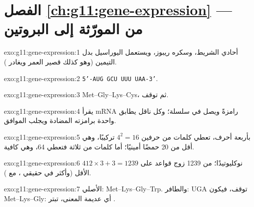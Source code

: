 \section*{الفصل \ref{ch:g11:gene-expression} --- من المورّثة إلى البروتين}

\begin{solution}{exo:g11:gene-expression:1}
 أحادي الشريط، وسكره ريبوز، ويستعمل اليوراسيل بدل التيمين (وهو
كذلك قصير العمر ويغادر ).
\end{solution}

\begin{solution}{exo:g11:gene-expression:2}
\texttt{5'-AUG GCU UUU UAA-3'}.
\end{solution}

\begin{solution}{exo:g11:gene-expression:3}
Met--Gly--Lys--Cys، ثم توقف.
\end{solution}

\begin{solution}{exo:g11:gene-expression:4}
 يقرأ mRNA رامزةً  ويصل  في سلسلة؛ وكل
 ناقل يطابق  واحدة برامزته المضادة ويجلب 
الموافق.
\end{solution}

\begin{solution}{exo:g11:gene-expression:5}
بأربعة أحرف، تعطي كلمات من حرفين $4^2 = 16$ تركيبًا، وهي أقل من 20
حمضًا أمينيًا؛ أما كلمات من ثلاثة فتعطي 64، وهي كافية.
\end{solution}

\begin{solution}{exo:g11:gene-expression:6}
$412 \times 3 + 3 = 1239$ نوكليوتيدًا؛  من 1239 زوج قواعد على
الأقل (وأكثر في حقيقي ، مع ).
\end{solution}

\begin{solution}{exo:g11:gene-expression:7}
الأصلي: Met--Lys--Gly--Trp. والطافر: UGA توقف، فيكون Met--Lys--Gly:
أي  عديمة المعنى، تبتر .
\end{solution}


